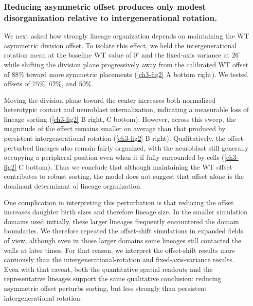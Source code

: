 \subsubsection{Reducing asymmetric offset produces only modest disorganization relative to intergenerational rotation.}
We next asked how strongly lineage organization depends on maintaining the WT asymmetric division offset.
To isolate this effect, we held the intergenerational rotation mean at the baseline WT value of $0^\circ$ and the fixed-axis variance at $26^\circ$ while shifting the division plane progressively away from the calibrated WT offset of $88\%$ toward more symmetric placements (\ref{ch3-fig2} A bottom right).
We tested offsets of $75\%$, $62\%$, and $50\%$.

Moving the division plane toward the center increases both normalized heterotypic contact and neuroblast internalization, indicating a measurable loss of lineage sorting (\ref{ch3-fig2} B right, C bottom).
However, across this sweep, the magnitude of the effect remains smaller on average than that produced by persistent intergenerational rotation (\ref{ch3-fig2} B right).
Qualitatively, the offset-perturbed lineages also remain fairly organized, with the neuroblast still generally occupying a peripheral position even when it if fully surrounded by cells (\ref{ch3-fig2} C bottom).
Thus we conclude that although maintaining the WT offset contributes to robust sorting, the model does not suggest that offset alone is the dominant determinant of lineage organization.

One complication in interpreting this perturbation is that reducing the offset increases daughter birth sizes and therefore lineage size.
In the smaller simulation domains used initially, these larger lineages frequently encountered the domain boundaries.
We therefore repeated the offset-shift simulations in expanded fields of view, although even in those larger domains some lineages still contacted the walls at later times.
For that reason, we interpret the offset-shift results more cautiously than the intergenerational-rotation and fixed-axis-variance results.
Even with that caveat, both the quantitative spatial readouts and the representative lineages support the same qualitative conclusion: reducing asymmetric offset perturbs sorting, but less strongly than persistent intergenerational rotation.

